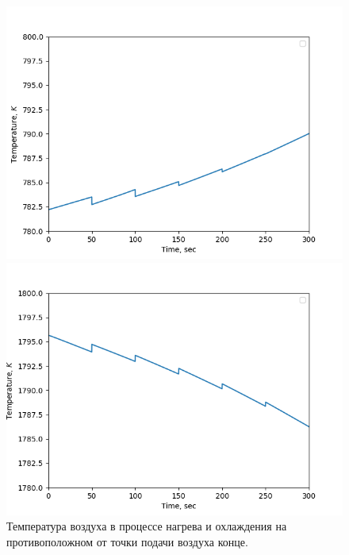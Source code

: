 \documentclass[a4paper,11pt,numreferences,mathsec,kaplist]{isuepsutf8}
\begin{document}
\begin{article}
\begin{figure}[ht]
    \caption {Температура воздуха в процессе нагрева и охлаждения на
    противоположном от точки подачи воздуха конце.}
    \label{fig:img1}
    \begin{minipage}[t]{0.49\textwidth}
        \centering
        \includegraphics[width=\textwidth]{img1}
    \end{minipage}
    \hfill
    \begin{minipage}[t]{0.49\textwidth}
        \centering
        \includegraphics[width=\textwidth]{img2}
    \end{minipage}
\end{figure}


\end{article}
\end{document}
